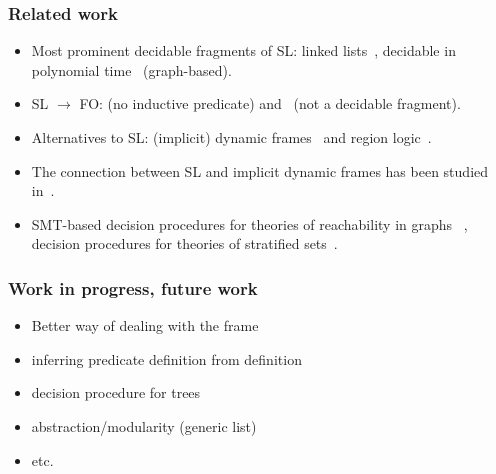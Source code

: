 \documentclass{beamer}
\begin{document}
\begin{frame}
  \frametitle{Related work}
{\small
  \begin{itemize}
  \item Most prominent decidable fragments of SL: linked lists~\cite{BerdineETAL04DecidableFragmentSeparationLogic}, decidable in polynomial time~\cite{CooketALFragmentSepLog} (graph-based).

\item SL $\rightarrow$ FO: \cite{Calcagno05fromseparation} (no inductive predicate) and~\cite{bobot12icfem} (not a decidable fragment).

\item Alternatives to SL: (implicit) dynamic frames~\cite{DBLP:journals/fac/Kassios11} and region logic~\cite{DBLP:conf/ecoop/BanerjeeNR08,DBLP:conf/vmcai/RosenbergBN12}.
\item The connection between SL and implicit dynamic frames has been studied in~\cite{DBLP:journals/corr/abs-1203-6859}.

\item SMT-based decision procedures for theories of reachability in graphs~\cite{DBLP:conf/popl/LahiriQ08, WiesMK11, TotlaWies13CompleteInsterpolation}
, decision procedures for theories of stratified sets~\cite{Zarba04CombiningSetsElements}.

\end{itemize}
}
\end{frame}

\iffalse
\begin{frame}
  \frametitle{Work in progress, future work}

  \begin{itemize}
  \item Better way of dealing with the frame
  \item inferring \LRJQ predicate definition from \JoshLogic definition
  \item decision procedure for trees
  \item abstraction/modularity (generic list)
  \item etc.
  \end{itemize}

\end{frame}
\end{document}
